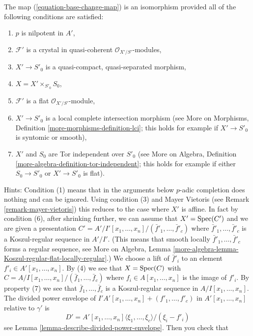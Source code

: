 \begin{remark}
\label{remark-base-change-isomorphism}
The map (\ref{equation-base-change-map}) is an isomorphism provided
all of the following conditions are satisfied:
\begin{enumerate}
\item $p$ is nilpotent in $A'$,
\item $\mathcal{F}'$ is a crystal in quasi-coherent
$\mathcal{O}_{X'/S'}$-modules,
\item $X' \to S'_0$ is a quasi-compact, quasi-separated morphism,
\item $X = X' \times_{S'_0} S_0$,
\item $\mathcal{F}'$ is a flat $\mathcal{O}_{X'/S'}$-module,
\item $X' \to S'_0$ is a local complete intersection morphism (see
More on Morphisms, Definition \ref{more-morphisms-definition-lci}; this
holds for example if $X' \to S'_0$ is syntomic or smooth),
\item $X'$ and $S_0$ are Tor independent over $S'_0$ (see
More on Algebra, Definition \ref{more-algebra-definition-tor-independent};
this holds for example if either $S_0 \to S'_0$ or $X' \to S'_0$ is flat).
\end{enumerate}
Hints: Condition (1) means that in the arguments below $p$-adic completion
does nothing and can be ignored.
Using condition (3) and Mayer Vietoris (see
Remark \ref{remark-mayer-vietoris}) this reduces to the case
where $X'$ is affine. In fact by condition (6), after shrinking
further, we can assume that $X' = \mathop{\mathrm{Spec}}(C')$ and we are given a presentation
$C' = A'/I'[x_1, \ldots, x_n]/(\bar f'_1, \ldots, \bar f'_c)$
where $\bar f'_1, \ldots, \bar f'_c$ is a Koszul-regular sequence in $A'/I'$.
(This means that smooth locally $\bar f'_1, \ldots, \bar f'_c$ forms
a regular sequence, see More on Algebra,
Lemma \ref{more-algebra-lemma-Koszul-regular-flat-locally-regular}.)
We choose a lift of
$\bar f'_i$ to an element $f'_i \in A'[x_1, \ldots, x_n]$. By (4) we see that
$X = \mathop{\mathrm{Spec}}(C)$ with $C = A/I[x_1, \ldots, x_n]/(\bar f_1, \ldots, \bar f_c)$
where $f_i \in A[x_1, \ldots, x_n]$ is the image of $f'_i$.
By property (7) we see that $\bar f_1, \ldots, \bar f_c$ is a Koszul-regular
sequence in $A/I[x_1, \ldots, x_n]$. The divided power envelope of
$I'A'[x_1, \ldots, x_n] + (f'_1, \ldots, f'_c)$ in $A'[x_1, \ldots, x_n]$
relative to $\gamma'$ is
$$
D' = A'[x_1, \ldots, x_n]\langle \xi_1, \ldots, \xi_c \rangle/(\xi_i - f'_i)
$$
see Lemma \ref{lemma-describe-divided-power-envelope}. Then you check that

\end{remark}
